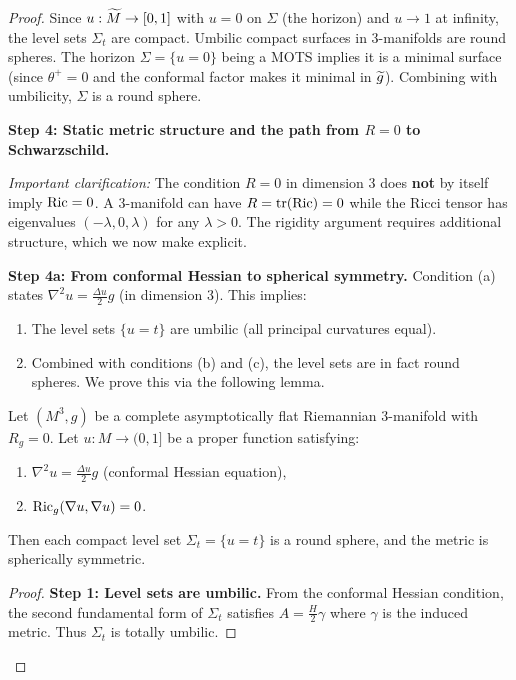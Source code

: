 \begin{proof}
Since $u: \widetilde{M} \to [0,1]$ with $u = 0$ on $\Sigma$ (the horizon) and $u \to 1$ at infinity, the level sets $\Sigma_t$ are compact. Umbilic compact surfaces in 3-manifolds are round spheres. The horizon $\Sigma = \{u=0\}$ being a MOTS implies it is a minimal surface (since $\theta^+ = 0$ and the conformal factor makes it minimal in $\widetilde{g}$). Combining with umbilicity, $\Sigma$ is a round sphere.

\textbf{Step 4: Static metric structure and the path from $R=0$ to Schwarzschild.}

\textit{Important clarification:} The condition $R = 0$ in dimension 3 does \textbf{not} by itself imply $\mathrm{Ric} = 0$. A 3-manifold can have $R = \operatorname{tr}(\mathrm{Ric}) = 0$ while the Ricci tensor has eigenvalues $(-\lambda, 0, \lambda)$ for any $\lambda > 0$. The rigidity argument requires additional structure, which we now make explicit.

\textbf{Step 4a: From conformal Hessian to spherical symmetry.}
Condition (a) states $\nabla^2 u = \frac{\Delta u}{2} g$ (in dimension 3). This implies:
\begin{enumerate}
    \item[(i)] The level sets $\{u = t\}$ are umbilic (all principal curvatures equal).
    \item[(ii)] Combined with conditions (b) and (c), the level sets are in fact round spheres. We prove this via the following lemma.
\end{enumerate}

\begin{lemma}\label{lem:UmbilicSpherical}
Let $(M^3, g)$ be a complete asymptotically flat Riemannian 3-manifold with $R_g = 0$. Let $u: M \to (0,1]$ be a proper function satisfying:
\begin{enumerate}
    \item $\nabla^2 u = \frac{\Delta u}{2} g$ (conformal Hessian equation),
    \item $\mathrm{Ric}_g(\nabla u, \nabla u) = 0$.
\end{enumerate}
Then each compact level set $\Sigma_t = \{u = t\}$ is a round sphere, and the metric is spherically symmetric.
\end{lemma}

\begin{proof}
\textbf{Step 1: Level sets are umbilic.} From the conformal Hessian condition, the second fundamental form of $\Sigma_t$ satisfies $A = \frac{H}{2} \gamma$ where $\gamma$ is the induced metric. Thus $\Sigma_t$ is totally umbilic.


\end{proof}
\end{proof}
